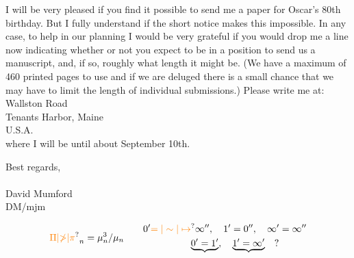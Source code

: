 I will be very pleased if you find it possible to send me a paper for Oscar's 80th birthday. But I fully understand if the short notice makes this impossible. In any case, to help in our planning I would be very grateful if you would drop me a line now indicating whether or not you expect to be in a position to send us a manuscript, and, if so, roughly what length it might be. (We have a maximum of 460 printed pages to use and if we are deluged there is a small chance that we may have to limit the length of individual submissions.) Please write me at:\\
Wallston Road\\
Tenants Harbor, Maine\\
U.S.A.\\

where I will be until about September 10th.

Best regards,\\
\\
David Mumford\\

DM/mjm

\[
\unsure{\Pi|\mathbb{\Pi}|\pi}_n=\mu_n^3/\mu_n
\qquad
\begin{aligned}
0'\unsure{=|\sim|\mapsto}\infty'',\quad 1'&=0'',\quad \infty'=\infty''\\
\underbrace{0'=1'},\quad&\underbrace{1'=\infty'}\quad ?
\end{aligned}
\]


